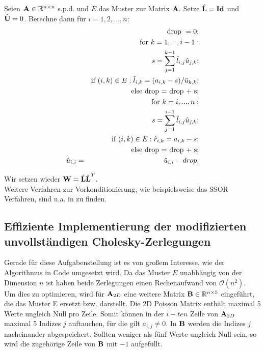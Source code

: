 Seien ${\textbf{A}} \in \mathbb{R}^{n \times n}$ s.p.d. und $E$ das Muster zur Matrix ${\textbf{A}}$. Setze $\hat{{\textbf{L}}} = {\textbf{Id}}$ und $\hat{{\textbf{U}}} = 0$. Berechne dann für $i=1,2,...,n$:
\begin{eqnarray}
&&\textnormal{drop } = 0;\notag\\
&&\textnormal{for } k = 1,...,i-1:\notag\\
&&s = \sum_{j=1}^{k-1} \hat l_{i,j} \hat u_{j,k};\notag\\
&&\textnormal{if } (i,k) \in E: \hat l_{i,k} = (a_{i,k} - s)/ \hat u_{k,k};\notag\\
&&\textnormal{else drop = drop + s};\notag \\
&&\textnormal{for } k = i,...,n: \notag \\
&&s = \sum_{j=1}^{i-1} \hat l_{i,j} \hat u_{j,k};\notag\\
&&\textnormal{if } (i,k) \in E: \hat r_{i,k} = a_{i,k} - s; \notag\\
&&\textnormal{else drop = drop + s};\notag \\
\hat u_{i,i} &=& \hat u_{i,i} -drop;
\end{eqnarray}

Wir setzen wieder ${\textbf{W}} = \hat{{\textbf{L}}} \hat{{\textbf{L}}}^{T}$. \\

Weitere Verfahren zur Vorkonditionierung, wie beispielsweise das SSOR-Verfahren, sind u.a. in \cite{SAAD5} zu finden.

\subsection{Effiziente Implementierung der modifizierten unvollständigen Cholesky-Zerlegungen}

Gerade für diese Aufgabenstellung ist es von großem Interesse, wie der Algorithmus in Code umgesetzt wird. Da das Muster $E$ unabhängig von der Dimension $n$ ist haben beide Zerlegungen einen Rechenaufwand von $\mathcal{O}(n^{2})$.\\
Um dies zu optimieren, wird für ${\textbf{A}}_{2D}$ eine weitere Matrix ${\textbf{B}} \in \mathbb{R}^{n \times 5}$ eingeführt, die das Muster E ersetzt bzw. darstellt. Die 2D Poisson Matrix enthält maximal 5 Werte ungleich Null pro Zeile. Somit können in der $i - ten$ Zeile von ${\textbf{A}}_{2D}$ maximal 5 Indizes $j$ auftauchen, für die gilt $a_{i,j} \ne 0$. In ${\textbf{B}}$ werden die Indizes $j$ nacheinander abgespeichert. Sollten weniger als fünf Werte ungleich Null sein, so wird die zugehörige Zeile von ${\textbf{B}}$ mit $-1$ aufgefüllt.

